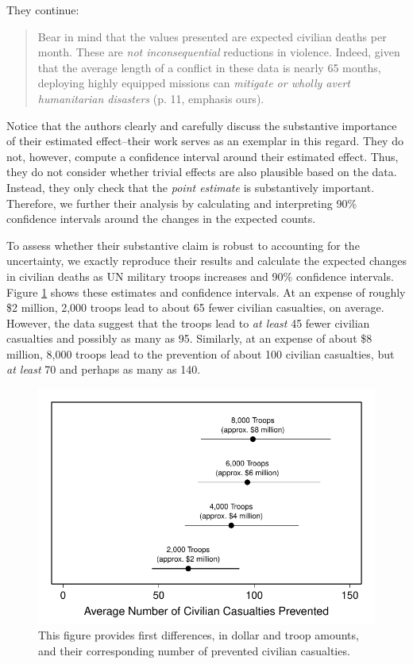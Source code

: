 \documentclass[12pt]{article}
\begin{document}
\noindent They continue:

\begin{quote}
Bear in mind that the values presented are expected civilian deaths per month. These are \emph{not inconsequential} reductions in violence. Indeed, given that the average length of a conflict in these data is nearly 65 months, deploying highly equipped missions can \emph{mitigate or wholly avert humanitarian disasters} (p. 11, emphasis ours).
\end{quote}

Notice that the authors clearly and carefully discuss the substantive importance of their estimated effect--their work serves as an exemplar in this regard. They do not, however, compute a confidence interval around their estimated effect. Thus, they do not consider whether trivial effects are also plausible based on the data. Instead, they only check that the \emph{point estimate} is substantively important. Therefore, we further their analysis by calculating and interpreting 90\% confidence intervals around the changes in the expected counts.

To assess whether their substantive claim is robust to accounting for the uncertainty, we exactly reproduce their results and calculate the expected changes in civilian deaths as UN military troops increases and 90\% confidence intervals. Figure \ref{fig:hks-ci} shows these estimates and confidence intervals. At an expense of roughly \$2 million, 2,000 troops lead to about 65 fewer civilian casualties, on average. However, the data suggest that the troops lead to \textit{at least} 45 fewer civilian casualties and possibly as many as 95. Similarly, at an expense of about \$8 million, 8,000 troops lead to the prevention of about 100 civilian casualties, but \emph{at least} 70 and perhaps as many as 140. 

\begin{figure}[H]
\begin{center}
\includegraphics[scale = .8]{figs/hks-ci.pdf}
\caption{This figure provides first differences, in dollar and troop amounts, and their corresponding number of prevented civilian casualties.}\label{fig:hks-ci}
\end{center}
\end{figure}
\end{document}

